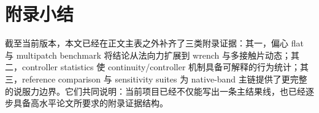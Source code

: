 

\section{附录小结}
截至当前版本，本文已经在正文主表之外补齐了三类附录证据：其一，偏心 flat 与 multipatch benchmark 将结论从法向力扩展到 wrench 与多接触片动态；其二，controller statistics 使 continuity/controller 机制具备可解释的行为统计；其三，reference comparison 与 sensitivity suites 为 native-band 主链提供了更完整的说服力边界。它们共同说明：当前项目已经不仅能写出一条主结果线，也已经逐步具备高水平论文所要求的附录证据结构。
